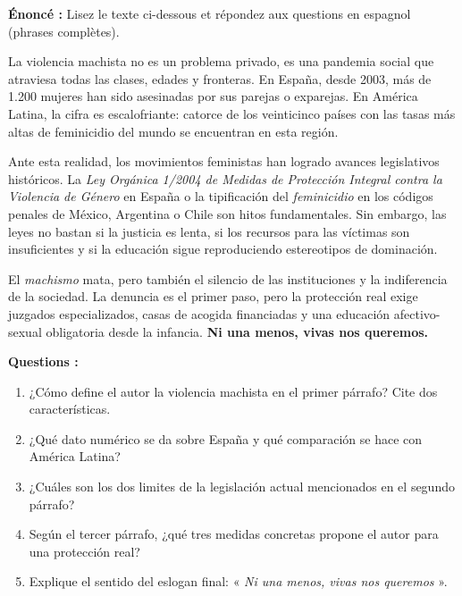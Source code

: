 \documentclass[11pt]{article}
\begin{document}
\begin{exoresolu}
\textbf{Énoncé :} Lisez le texte ci-dessous et répondez aux questions en espagnol (phrases complètes).

\begin{textebox}
La violencia machista no es un problema privado, es una pandemia social que atraviesa todas las clases, edades y fronteras. En España, desde 2003, más de 1.200 mujeres han sido asesinadas por sus parejas o exparejas. En América Latina, la cifra es escalofriante: catorce de los veinticinco países con las tasas más altas de feminicidio del mundo se encuentran en esta región. 

Ante esta realidad, los movimientos feministas han logrado avances legislativos históricos. La \emph{Ley Orgánica 1/2004 de Medidas de Protección Integral contra la Violencia de Género} en España o la tipificación del \emph{feminicidio} en los códigos penales de México, Argentina o Chile son hitos fundamentales. Sin embargo, las leyes no bastan si la justicia es lenta, si los recursos para las víctimas son insuficientes y si la educación sigue reproduciendo estereotipos de dominación. 

El \emph{machismo} mata, pero también el silencio de las instituciones y la indiferencia de la sociedad. La denuncia es el primer paso, pero la protección real exige juzgados especializados, casas de acogida financiadas y una educación afectivo-sexual obligatoria desde la infancia. \textbf{Ni una menos, vivas nos queremos.}
\end{textebox}

\textbf{Questions :}
\begin{enumerate}
    \item ¿Cómo define el autor la violencia machista en el primer párrafo? Cite dos características.
    \item ¿Qué dato numérico se da sobre España y qué comparación se hace con América Latina?
    \item ¿Cuáles son los dos limites de la legislación actual mencionados en el segundo párrafo?
    \item Según el tercer párrafo, ¿qué tres medidas concretas propone el autor para una protección real?
    \item Explique el sentido del eslogan final: « \emph{Ni una menos, vivas nos queremos} ».
\end{enumerate}


\end{exoresolu}
\end{document}
